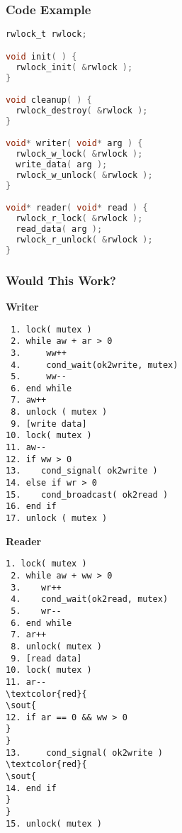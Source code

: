 \begin{frame}[fragile]
	\frametitle{Code Example}

	\begin{center}
		\begin{lstlisting}[language=C]
rwlock_t rwlock;

void init( ) {
  rwlock_init( &rwlock );
}

void cleanup( ) {
  rwlock_destroy( &rwlock );
}

void* writer( void* arg ) {
  rwlock_w_lock( &rwlock );
  write_data( arg );
  rwlock_w_unlock( &rwlock );
}

void* reader( void* read ) {
  rwlock_r_lock( &rwlock );
  read_data( arg );
  rwlock_r_unlock( &rwlock );
}
		\end{lstlisting}
	\end{center}
\end{frame}

\begin{frame}[fragile]
	\frametitle{Would This Work?}

	\begin{multicols}{2}
		\small
		\textbf{Writer}
		\begin{verbatim}
 1. lock( mutex )
 2. while aw + ar > 0
 3.     ww++
 4.     cond_wait(ok2write, mutex)
 5.     ww--
 6. end while
 7. aw++
 8. unlock ( mutex )
 9. [write data]
10. lock( mutex )
11. aw--
12. if ww > 0
13.    cond_signal( ok2write )
14. else if wr > 0
15.    cond_broadcast( ok2read )
16. end if
17. unlock ( mutex )
		\end{verbatim}
		\columnbreak
		\textbf{Reader}
		\begin{Verbatim}[commandchars=\\\{\}]
 1. lock( mutex )
 2. while aw + ww > 0
 3.    wr++
 4.    cond_wait(ok2read, mutex)
 5.    wr--
 6. end while
 7. ar++
 8. unlock( mutex )
 9. [read data]
10. lock( mutex )
11. ar--
\textcolor{red}{
\sout{
12. if ar == 0 && ww > 0
}
}
13.     cond_signal( ok2write )
\textcolor{red}{
\sout{
14. end if
}
}
15. unlock( mutex )


		\end{Verbatim}
	\end{multicols}
	\vspace{-2em}
\end{frame}


